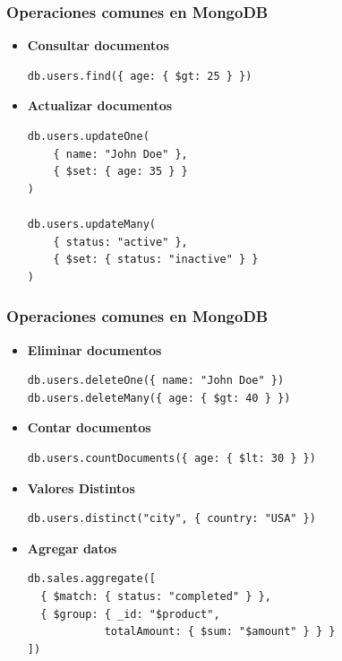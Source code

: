 \begin{frame}[fragile]
\frametitle{Operaciones comunes en MongoDB}
\begin{itemize}
    \item \textbf{Consultar documentos}
    \begin{verbatim}
db.users.find({ age: { $gt: 25 } })
    \end{verbatim}

     
    \item \textbf{Actualizar documentos}
    \begin{verbatim}
db.users.updateOne(
    { name: "John Doe" },
    { $set: { age: 35 } }
)

db.users.updateMany(
    { status: "active" }, 
    { $set: { status: "inactive" } }
)

    \end{verbatim}
\end{itemize}
\end{frame}

\begin{frame}[fragile]
\frametitle{Operaciones comunes en MongoDB}
\begin{itemize} 
    \item \textbf{Eliminar documentos}
    \begin{verbatim}
db.users.deleteOne({ name: "John Doe" })
db.users.deleteMany({ age: { $gt: 40 } })
    \end{verbatim}
         
    \item \textbf{Contar documentos}
\begin{verbatim}
db.users.countDocuments({ age: { $lt: 30 } })
\end{verbatim}
         
    \item \textbf{Valores Distintos}
\begin{verbatim}
db.users.distinct("city", { country: "USA" })
\end{verbatim}
         
    \item \textbf{Agregar datos}
\begin{verbatim}
db.sales.aggregate([
  { $match: { status: "completed" } },
  { $group: { _id: "$product", 
            totalAmount: { $sum: "$amount" } } }
])
\end{verbatim}

\end{itemize}

\end{frame}